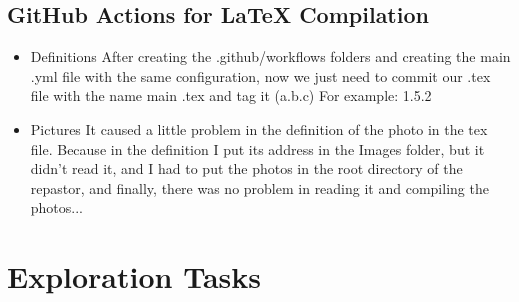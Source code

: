 \documentclass[12pt]{article}
\begin{document}
\subsection{GitHub Actions for LaTeX Compilation}
\begin{itemize}
  \item Definitions \newline
  After creating the .github/workflows folders and creating the main .yml file with the same configuration, now we just need to commit our .tex file with the name main .tex and tag it (a.b.c)
For example:
1.5.2
\item Pictures
It caused a little problem in the definition of the photo in the tex file. Because in the definition I put its address in the Images folder, but it didn't read it, and I had to put the photos in the root directory of the repastor, and finally, there was no problem in reading it and compiling the photos...
\end{itemize}



\section{Exploration Tasks}
\end{document}
